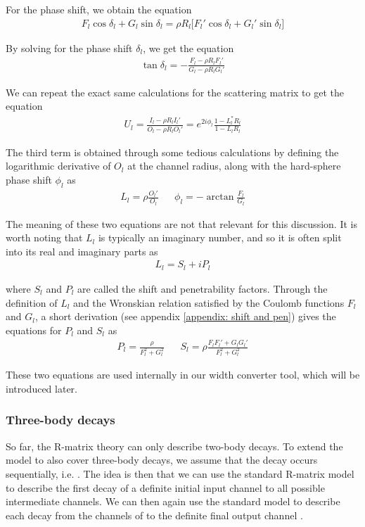 For the phase shift, we obtain the equation
\begin{align*}
	F_l \cos\delta_l  + G_l \sin\delta_l = \rho R_l\big[F_l'\cos\delta_l + G_l'\sin\delta_l \big]
\end{align*}

By solving for the phase shift $\delta_l$, we get the equation
\begin{align*}
	\tan\delta_l = -\frac{F_l - \rho R_l F_l'}{G_l - \rho R_l G_l'}
\end{align*}

We can repeat the exact same calculations for the scattering matrix to get the equation
\begin{align} \label{theory: r-matrix: scattering matrix}
	U_l = \frac{I_l - \rho R_l I_l'}{O_l - \rho R_l O_l'} = e^{2i\phi_l}\frac{1 - L_l^* R_l}{1 - L_l R_l}
\end{align}

The third term is obtained through some tedious calculations by defining the logarithmic derivative of $O_l$ at the channel radius, along with the hard-sphere phase shift $\phi_l$ as
\begin{align*}
	L_l = \rho \frac{O_l'}{O_l} && \phi_l = -\arctan \frac{F_l}{G_l}
\end{align*}

The meaning of these two equations are not that relevant for this discussion. It is worth noting that $L_l$ is typically an imaginary number, and so it is often split into its real and imaginary parts as
\begin{align*}
	L_l = S_l + iP_l
\end{align*}

where $S_l$ and $P_l$ are called the shift and penetrability factors. Through the definition of $L_l$ and the Wronskian relation satisfied by the Coulomb functions $F_l$ and $G_l$, a short derivation (see appendix \ref{appendix: shift and pen}) gives the equations for $P_l$ and $S_l$ as
\begin{align} \label{theory: r-matrix: penetration shift}
	P_l = \frac{\rho}{F_l^2 + G_l^2} && S_l = \rho\frac{F_l F_l' + G_l G_l'}{F_l^2 + G_l^2}	
\end{align}

These two equations are used internally in our width converter tool, which will be introduced later. 

\subsubsection{Three-body decays} \label{sec: theory: r-matrix: three body}
So far, the R-matrix theory can only describe two-body decays. To extend the model to also cover three-body decays, we assume that the decay occurs sequentially, i.e. . The idea is then that we can use the standard R-matrix model to describe the first decay of a definite initial input  channel to all possible intermediate  channels. We can then again use the standard model to describe each decay from the channels of  to the definite final output channel . \\

